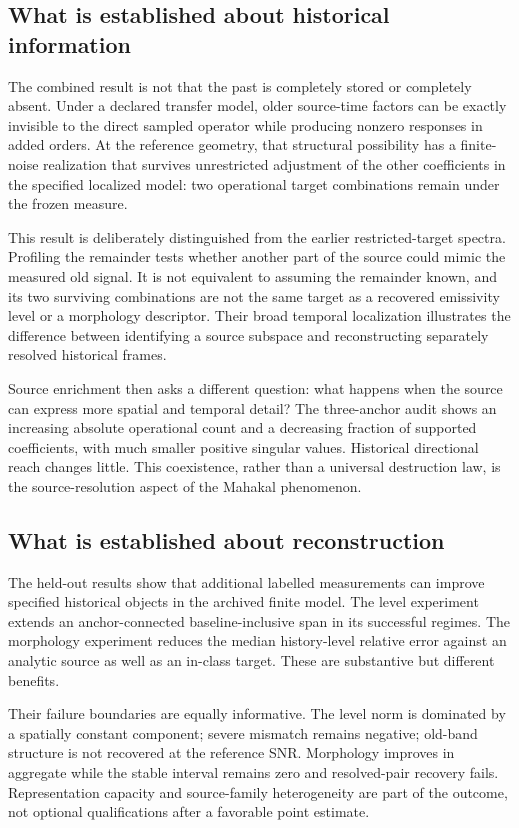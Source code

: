 \subsection{What is established about historical information}
The combined result is not that the past is completely stored or completely absent. Under a declared transfer model, older source-time factors can be exactly invisible to the direct sampled operator while producing nonzero responses in added orders. At the reference geometry, that structural possibility has a finite-noise realization that survives unrestricted adjustment of the other coefficients in the specified localized model: two operational target combinations remain under the frozen measure.

This result is deliberately distinguished from the earlier restricted-target spectra. Profiling the remainder tests whether another part of the source could mimic the measured old signal. It is not equivalent to assuming the remainder known, and its two surviving combinations are not the same target as a recovered emissivity level or a morphology descriptor. Their broad temporal localization illustrates the difference between identifying a source subspace and reconstructing separately resolved historical frames.

Source enrichment then asks a different question: what happens when the source can express more spatial and temporal detail? The three-anchor audit shows an increasing absolute operational count and a decreasing fraction of supported coefficients, with much smaller positive singular values. Historical directional reach changes little. This coexistence, rather than a universal destruction law, is the source-resolution aspect of the Mahakal phenomenon.

\subsection{What is established about reconstruction}
The held-out results show that additional labelled measurements can improve specified historical objects in the archived finite model. The level experiment extends an anchor-connected baseline-inclusive span in its successful regimes. The morphology experiment reduces the median history-level relative error against an analytic source as well as an in-class target. These are substantive but different benefits.

Their failure boundaries are equally informative. The level norm is dominated by a spatially constant component; severe mismatch remains negative; old-band structure is not recovered at the reference SNR. Morphology improves in aggregate while the stable interval remains zero and resolved-pair recovery fails. Representation capacity and source-family heterogeneity are part of the outcome, not optional qualifications after a favorable point estimate.

